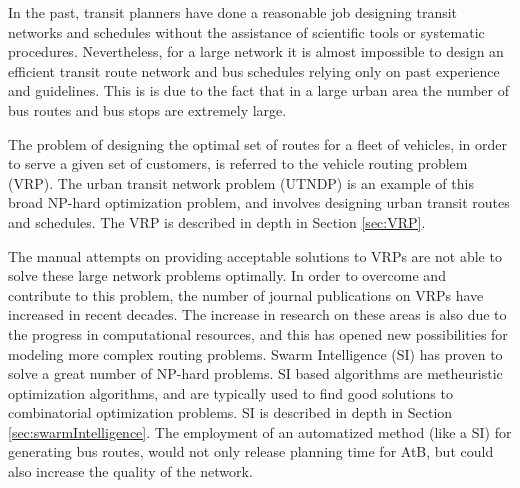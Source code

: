 
In the past, transit planners have done a reasonable job designing transit networks and schedules without the assistance of scientific tools or systematic procedures. Nevertheless, for a large network it is almost impossible to design an efficient transit route network and bus schedules relying only on past experience and guidelines. This is is due to the fact that in a large urban area the number of bus routes and bus stops are extremely large. 

The problem of designing the optimal set of routes for a fleet of vehicles, in order to serve a given set of customers, is referred to the vehicle routing problem (VRP). The urban transit network problem (UTNDP) is an example of this broad NP-hard optimization problem, and involves designing urban transit routes and schedules. The VRP is described in depth in Section \vref{sec:VRP}.

The manual attempts on providing acceptable solutions to VRPs are not able to solve these large network problems optimally. In order to overcome and contribute to this problem, the number of journal publications on VRPs have increased in recent decades. The increase in research on these areas is also due to the progress in computational resources, and this has opened new possibilities for modeling more complex routing problems. Swarm Intelligence (SI) has proven to solve a great number of NP-hard problems\citep{dorigo97, lucic03}. SI based algorithms are metheuristic optimization algorithms, and are typically used to find good solutions to combinatorial optimization problems. SI is described in depth in Section \vref{sec:swarmIntelligence}. The employment of an automatized method (like a SI) for generating bus routes, would not only release planning time for AtB, but could also increase the quality of the network.



